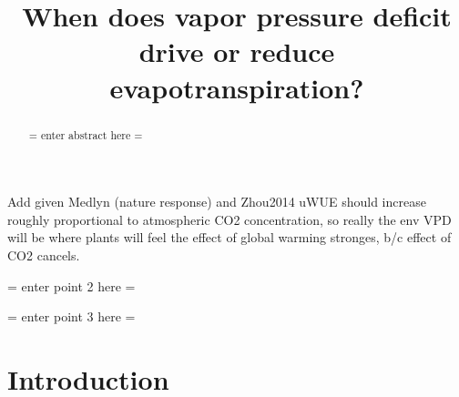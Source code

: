 \documentclass[draft,linenumbers]{gcbjournal}
\begin{document}
\title{When does vapor pressure deficit drive or reduce evapotranspiration?}





\begin{keypoints}
\item Add given Medlyn (nature response) and Zhou2014 uWUE should increase roughly proportional to atmospheric CO2 concentration,
  so really the env VPD will be where plants will feel the effect of global warming stronges, b/c effect of CO2 cancels.
\item = enter point 2 here = 
\item = enter point 3 here = 
\end{keypoints}


\begin{abstract}
= enter abstract here =
\end{abstract}

\section{Introduction}
\end{document}
